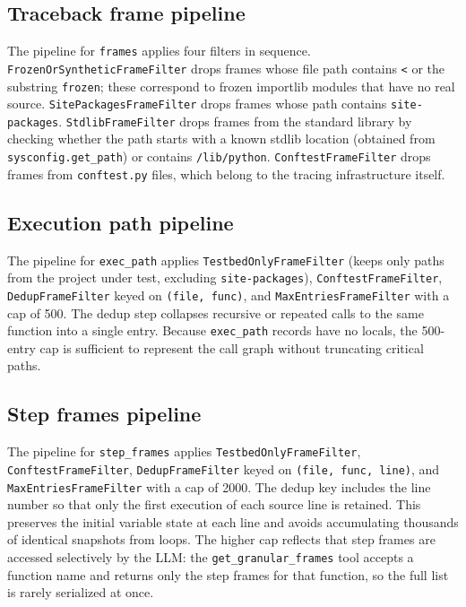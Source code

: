 
\subsection{Traceback frame pipeline}

The pipeline for \texttt{frames} applies four filters in sequence. \texttt{FrozenOrSyntheticFrameFilter} drops frames whose file path contains \texttt{<} or the substring \texttt{frozen}; these correspond to frozen importlib modules that have no real source. \texttt{SitePackagesFrameFilter} drops frames whose path contains \texttt{site-packages}. \texttt{StdlibFrameFilter} drops frames from the standard library by checking whether the path starts with a known stdlib location (obtained from \texttt{sysconfig.get\_path}) or contains \texttt{/lib/python}. \texttt{ConftestFrameFilter} drops frames from \texttt{conftest.py} files, which belong to the tracing infrastructure itself.

\subsection{Execution path pipeline}

The pipeline for \texttt{exec\_path} applies \texttt{TestbedOnlyFrameFilter} (keeps only paths from the project under test, excluding \texttt{site-packages}), \texttt{ConftestFrameFilter}, \texttt{DedupFrameFilter} keyed on \texttt{(file, func)}, and \texttt{MaxEntriesFrameFilter} with a cap of 500. The dedup step collapses recursive or repeated calls to the same function into a single entry. Because \texttt{exec\_path} records have no locals, the 500-entry cap is sufficient to represent the call graph without truncating critical paths.

\subsection{Step frames pipeline}

The pipeline for \texttt{step\_frames} applies \texttt{TestbedOnlyFrameFilter}, \texttt{ConftestFrameFilter}, \texttt{DedupFrameFilter} keyed on \texttt{(file, func, line)}, and \texttt{MaxEntriesFrameFilter} with a cap of 2000. The dedup key includes the line number so that only the first execution of each source line is retained. This preserves the initial variable state at each line and avoids accumulating thousands of identical snapshots from loops. The higher cap reflects that step frames are accessed selectively by the LLM: the \texttt{get\_granular\_frames} tool accepts a function name and returns only the step frames for that function, so the full list is rarely serialized at once.


